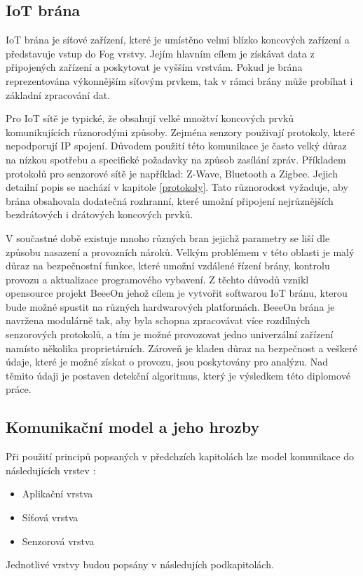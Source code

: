  \subsection{IoT brána} 
 IoT brána je síťové zařízení, které je umístěno velmi blízko koncových zařízení
 a představuje vstup do Fog vrstvy. Jejím hlavním cílem je získávat data 
 z připojených zařízení a poskytovat je vyšším vrstvám. Pokud je brána reprezentována
 výkonnějším síťovým prvkem, tak v rámci brány může probíhat i základní zpracování
 dat. 
 
 Pro IoT sítě je typické, že obsahují velké množtví koncových prvků komunikujících
 různorodými způsoby. Zejména senzory použivají protokoly, které nepodporují
 IP spojení. Důvodem použití této komunikace je často velký
 důraz na nízkou spotřebu a specifické požadavky na způsob zasílání zpráv.
 Příkladem protokolů pro senzorové sítě je například:
 Z-Wave, Bluetooth a Zigbee. Jejich detailní popis se nachází v kapitole \ref{protokoly}.
 Tato různorodost vyžaduje, aby brána obsahovala dodatečná rozhranní, které 
 umožní připojení nejrůznějších bezdrátových i drátových koncových prvků. 
 
 V součastné době existuje mnoho různých bran jejichž parametry se liší dle 
 způsobu nasazení a provozních nároků. Velkým problémem v této oblasti je malý 
 důraz na bezpečnostní funkce, které umožní vzdálené řízení brány, kontrolu provozu a 
 aktualizace programového vybavení. Z těchto důvodů vznikl opensource projekt BeeeOn \cite{beeeon}
 jehož cílem je vytvořit softwarou IoT bránu, kterou bude možné spustit na různých 
 hardwarových platformách. BeeeOn brána je navržena modulárně tak, aby byla schopna 
 zpracovávat více rozdílných senzorových protokolů, a tím je možné provozovat jedno
 univerzální zařízení namísto několika proprietárních. Zároveň je kladen důraz na bezpečnost 
 a veškeré údaje, které je možné získat o provozu, jsou poskytovány pro analýzu. Nad těmito údaji
 je postaven detekční algoritmus, který je výsledkem této diplomové práce.
 

 \subsection{Komunikační model a jeho hrozby}
 Při použití principů popsaných v předchzích kapitolách lze model komunikace
 do následujících vrstev \cite{iotSurvey}:
 \begin{itemize}
 \item Aplikační vrstva 
 \item Síťová vrstva
 \item Senzorová vrstva
\end{itemize}
 Jednotlivé vrstvy budou popsány v následujích podkapitolách.
 
